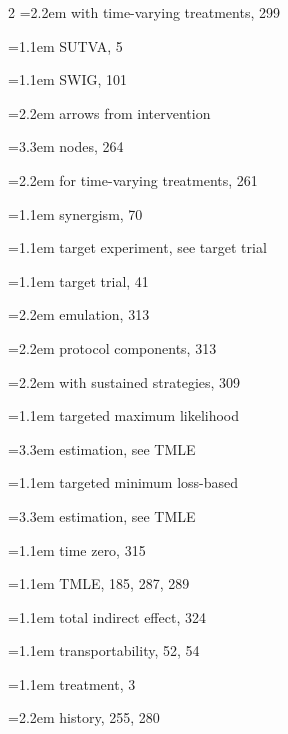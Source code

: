 \begin{multicols}{2}
\hspace*{1.1em}\hangindent=2.2em with time-varying treatments, 299\par
\hangindent=1.1em SUTVA, 5\par
\hangindent=1.1em SWIG, 101\par
\hspace*{1.1em}\hangindent=2.2em arrows from intervention\par
\hspace*{2.2em}\hangindent=3.3em nodes, 264\par
\hspace*{1.1em}\hangindent=2.2em for time-varying treatments, 261\par
\hangindent=1.1em synergism, 70\par
\hangindent=1.1em target experiment, see target trial\par
\hangindent=1.1em target trial, 41\par
\hspace*{1.1em}\hangindent=2.2em emulation, 313\par
\hspace*{1.1em}\hangindent=2.2em protocol components, 313\par
\hspace*{1.1em}\hangindent=2.2em with sustained strategies, 309\par
\hangindent=1.1em targeted maximum likelihood\par
\hspace*{2.2em}\hangindent=3.3em estimation, see TMLE\par
\hangindent=1.1em targeted minimum loss-based\par
\hspace*{2.2em}\hangindent=3.3em estimation, see TMLE\par
\hangindent=1.1em time zero, 315\par
\hangindent=1.1em TMLE, 185, 287, 289\par
\hangindent=1.1em total indirect effect, 324\par
\hangindent=1.1em transportability, 52, 54\par
\hangindent=1.1em treatment, 3\par
\hspace*{1.1em}\hangindent=2.2em history, 255, 280\par

\end{multicols}
